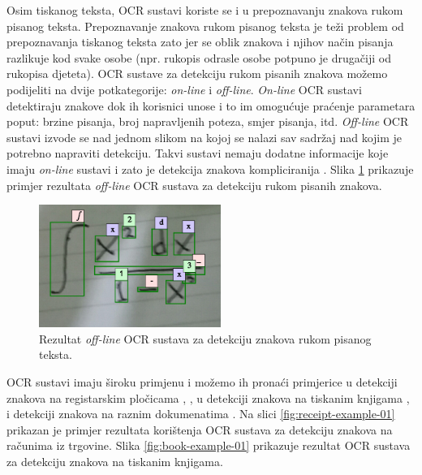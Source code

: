 \documentclass[times, utf8, zavrsni]{fer}
\begin{document}
Osim tiskanog teksta, OCR sustavi koriste se i u prepoznavanju znakova rukom pisanog teksta.
Prepoznavanje znakova rukom pisanog teksta je teži problem od prepoznavanja tiskanog teksta \citep{DBLP:journals/corr/abs-1710-05703} zato jer
se oblik znakova i njihov način pisanja razlikuje kod svake osobe (npr. rukopis odrasle osobe potpuno je drugačiji od
rukopisa djeteta).
OCR sustave za detekciju rukom pisanih znakova možemo podijeliti na dvije potkategorije:
\emph{on-line} i \emph{off-line}. \emph{On-line} OCR sustavi detektiraju znakove dok
ih korisnici unose i to im omogućuje praćenje parametara poput: brzine pisanja, broj napravljenih poteza,
smjer pisanja, itd. \emph{Off-line} OCR sustavi izvode se nad jednom slikom na kojoj se nalazi
sav sadržaj nad kojim je potrebno napraviti detekciju. Takvi sustavi nemaju dodatne informacije koje imaju
\emph{on-line} sustavi i zato je detekcija znakova kompliciranija \citep{DBLP:journals/corr/abs-1710-05703}. Slika \ref{fig:math-example-01} prikazuje primjer rezultata
\emph{off-line} OCR sustava za detekciju rukom pisanih znakova.

\begin{figure}[htb]
    \centering
    \includegraphics[height=4cm]{images/math-example-01.png}
    \caption{Rezultat \emph{off-line} OCR sustava za detekciju znakova rukom pisanog teksta.}
    \label{fig:math-example-01}
\end{figure}

OCR sustavi imaju široku primjenu i možemo ih pronaći primjerice u detekciji
znakova na registarskim pločicama \citep{DBLP:journals/corr/Saghaei16a}, \citep{DBLP:journals/corr/abs-1802-09567},
u detekciji znakova na tiskanim knjigama \citep{DBLP:journals/corr/abs-1802-10033},
\citep{Christy:2017:MDE:3172938.3075645} i
detekciji znakova na raznim dokumenatima \citep{DBLP:journals/corr/HarrajR15} \citep{verma2016ocr}. Na slici \ref{fig:receipt-example-01}
prikazan je primjer rezultata korištenja OCR sustava za detekciju znakova na računima iz trgovine.
Slika \ref{fig:book-example-01} prikazuje rezultat OCR sustava za detekciju znakova na tiskanim knjigama.
\end{document}
